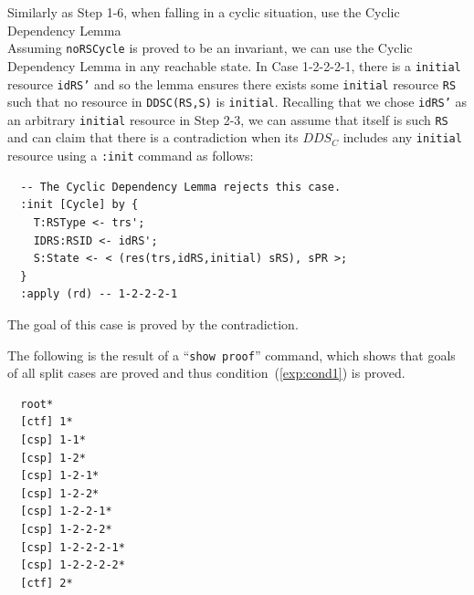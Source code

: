 \documentclass[12pt]{report}
\newcommand{\stt}[1]{{\small{\tt {#1}}}}
\begin{document}
 Similarly as Step 1-6, when falling in a
cyclic situation, use the Cyclic Dependency Lemma \\
Assuming {\tt noRSCycle} is proved to be an invariant, we can use the
Cyclic Dependency Lemma in any reachable state. In Case 1-2-2-2-1,
there is a {\tt initial} resource {\tt idRS'} and so the lemma ensures
there exists some {\tt initial} resource {\tt RS} such that no
resource in \stt{DDSC(RS,S)} is {\tt initial}. Recalling that we chose
{\tt idRS'} as an arbitrary {\tt initial} resource in Step 2-3, we can
assume that itself is such {\tt RS} and can claim that there is a
contradiction when its $DDS_C$ includes any {\tt initial} resource
using a {\tt :init} command as follows:
\small
\begin{verbatim}
  -- The Cyclic Dependency Lemma rejects this case.
  :init [Cycle] by {
    T:RSType <- trs';
    IDRS:RSID <- idRS';
    S:State <- < (res(trs,idRS,initial) sRS), sPR >;
  }
  :apply (rd) -- 1-2-2-2-1
\end{verbatim}
\normalsize
The goal of this case is proved by the contradiction.

The following is the result of a ``\stt{show proof}'' command, which shows
that goals of all split cases are proved and thus
condition~(\ref{exp:cond1}) is proved.
\small
\begin{verbatim}
  root*
  [ctf] 1*
  [csp] 1-1*
  [csp] 1-2*
  [csp] 1-2-1*
  [csp] 1-2-2*
  [csp] 1-2-2-1*
  [csp] 1-2-2-2*
  [csp] 1-2-2-2-1*
  [csp] 1-2-2-2-2*
  [ctf] 2*
\end{verbatim}
\normalsize
\end{document}
